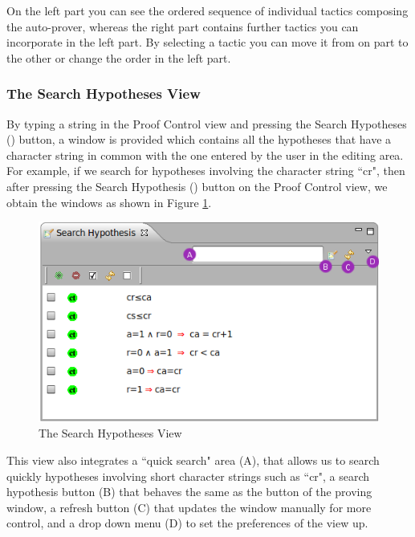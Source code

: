 On the left part you can see the ordered sequence of individual tactics composing the auto-prover, whereas the right part contains further tactics you can incorporate in the left part. By selecting a tactic you can move it from on part to the other or change the order in the left part. 

\subsubsection{The Search Hypotheses View}

By typing a string in the \textsf{Proof Control} view and pressing the \textsf{Search Hypotheses} () button, a window is provided which contains all the  hypotheses that have a character string in common with the one entered by the user in the editing area. For example, if we search for hypotheses involving the character string ``cr", then after pressing the \textsf{Search Hypothesis} () button on the \textsf{Proof Control} view, we obtain the windows as shown in Figure \ref{fig_ref_01_proving_perspective7}. 

\begin{figure}[!ht]
\begin{center}
	\includegraphics{img/reference/ref_01_proving_perspective7.png}
	\caption{The Search Hypotheses View}
	\label{fig_ref_01_proving_perspective7}
\end{center}
\end{figure}

This view also integrates a ``quick search" area (A), that allows us to search quickly hypotheses involving short character strings such as ``cr", a search hypothesis button (B) that behaves the same as the button of the proving window, a refresh button (C) that updates the window manually for more control, and a drop down menu (D) to set the preferences of the view up.

